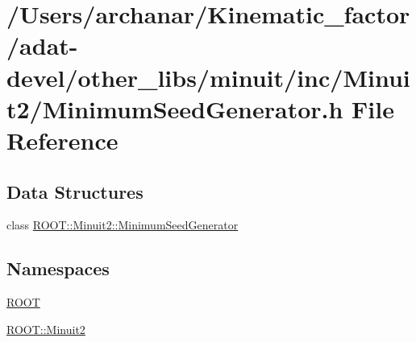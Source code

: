 \hypertarget{adat-devel_2other__libs_2minuit_2inc_2Minuit2_2MinimumSeedGenerator_8h}{}\section{/\+Users/archanar/\+Kinematic\+\_\+factor/adat-\/devel/other\+\_\+libs/minuit/inc/\+Minuit2/\+Minimum\+Seed\+Generator.h File Reference}
\label{adat-devel_2other__libs_2minuit_2inc_2Minuit2_2MinimumSeedGenerator_8h}
\subsection*{Data Structures}
\begin{DoxyCompactItemize}
\item 
class \mbox{\hyperlink{classROOT_1_1Minuit2_1_1MinimumSeedGenerator}{R\+O\+O\+T\+::\+Minuit2\+::\+Minimum\+Seed\+Generator}}
\end{DoxyCompactItemize}
\subsection*{Namespaces}
\begin{DoxyCompactItemize}
\item 
 \mbox{\hyperlink{namespaceROOT}{R\+O\+OT}}
\item 
 \mbox{\hyperlink{namespaceROOT_1_1Minuit2}{R\+O\+O\+T\+::\+Minuit2}}
\end{DoxyCompactItemize}
